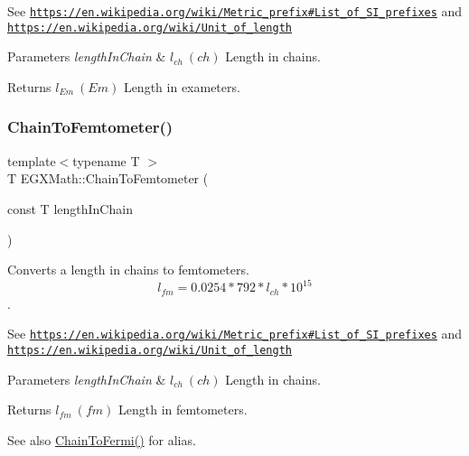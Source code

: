 See \href{https://en.wikipedia.org/wiki/Metric_prefix#List_of_SI_prefixes}{\tt https\+://en.\+wikipedia.\+org/wiki/\+Metric\+\_\+prefix\#\+List\+\_\+of\+\_\+\+S\+I\+\_\+prefixes} and \href{https://en.wikipedia.org/wiki/Unit_of_length}{\tt https\+://en.\+wikipedia.\+org/wiki/\+Unit\+\_\+of\+\_\+length} 
\begin{DoxyParams}{Parameters}
{\em length\+In\+Chain} & $ l_{ch}\ (ch)$ Length in chains. \\
\hline
\end{DoxyParams}
\begin{DoxyReturn}{Returns}
$ l_{Em}\ (Em)$ Length in exameters. 
\end{DoxyReturn}
\mbox{\label{group___e_g_x_math-_conversions-_length_conversions-_imperial-_chain-_s_i_ga21bde6f9a920aced344185d4ed645183}} 
\subsubsection{\texorpdfstring{Chain\+To\+Femtometer()}{ChainToFemtometer()}}
{\footnotesize\ttfamily template$<$typename T $>$ \\
T E\+G\+X\+Math\+::\+Chain\+To\+Femtometer (\begin{DoxyParamCaption}\item[{const T}]{length\+In\+Chain }\end{DoxyParamCaption})}



Converts a length in chains to femtometers. \[ l_{fm}=0.0254 * 792 * l_{ch} * 10^{15} \]. 

See \href{https://en.wikipedia.org/wiki/Metric_prefix#List_of_SI_prefixes}{\tt https\+://en.\+wikipedia.\+org/wiki/\+Metric\+\_\+prefix\#\+List\+\_\+of\+\_\+\+S\+I\+\_\+prefixes} and \href{https://en.wikipedia.org/wiki/Unit_of_length}{\tt https\+://en.\+wikipedia.\+org/wiki/\+Unit\+\_\+of\+\_\+length} 
\begin{DoxyParams}{Parameters}
{\em length\+In\+Chain} & $ l_{ch}\ (ch)$ Length in chains. \\
\hline
\end{DoxyParams}
\begin{DoxyReturn}{Returns}
$ l_{fm}\ (fm)$ Length in femtometers. 
\end{DoxyReturn}
\begin{DoxySeeAlso}{See also}
\mbox{\hyperlink{group___e_g_x_math-_conversions-_length_conversions-_imperial-_chain-_non-_s_i_ga88b0e20b062ca36346a6daeb5052c40a}{Chain\+To\+Fermi()}} for alias. 
\end{DoxySeeAlso}
\mbox{\label{group___e_g_x_math-_conversions-_length_conversions-_imperial-_chain-_s_i_ga4e3a17428c28a61c1aaf1de8c094f31d}} 
